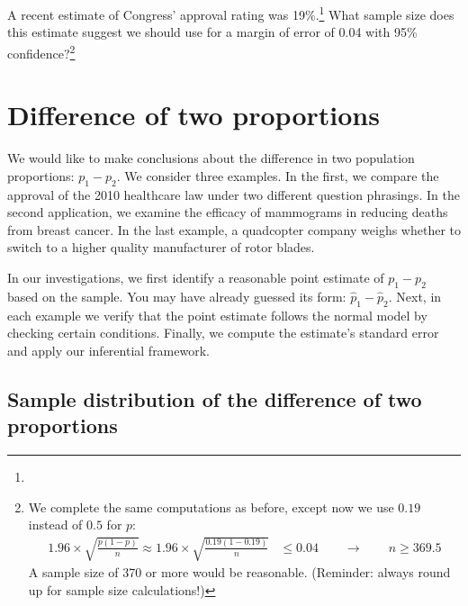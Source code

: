 \begin{exercise}
A recent estimate of Congress' approval rating was 19\%.\footnote{} What sample size does this estimate suggest we should use for a margin of error of 0.04 with 95\% confidence?\footnote{We complete the same computations as before, except now we use $0.19$ instead of $0.5$ for $p$:
\begin{align*}
1.96\times \sqrt{\frac{p(1-p)}{n}} \approx
1.96\times \sqrt{\frac{0.19(1-0.19)}{n}} &\leq 0.04 \qquad\to\qquad n \geq 369.5
\end{align*}
A sample size of 370 or more would be reasonable. (Reminder: always round up for sample size calculations!)}


\end{exercise}



\textC{\newpage}



\section{Difference of two proportions}
\label{differenceOfTwoProportions}

We would like to make conclusions about the difference in two population proportions: \mbox{$p_1 - p_2$}. We consider three examples. In the first, we compare the approval of the 2010 healthcare law under two different question phrasings. In the second application, we examine the efficacy of mammograms in reducing deaths from breast cancer. In the last example, a quadcopter company weighs whether to switch to a higher quality manufacturer of rotor blades.

In our investigations, we first identify a reasonable point estimate of $p_1 - p_2$ based on the sample. You may have already guessed its form: $\hat{p}_1 - \hat{p}_2$. Next, in each example we verify that the point estimate follows the normal model by checking certain conditions. Finally, we compute the estimate's standard error and apply our inferential framework.


\subsection{Sample distribution of the difference of two proportions}


